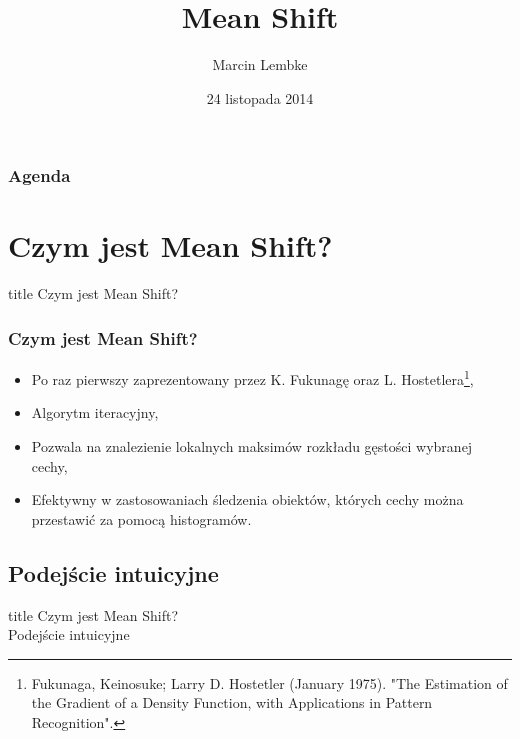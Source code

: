 \documentclass{beamer}
\title{Mean Shift}
\author{Marcin Lembke}
\date{24 listopada 2014}
\begin{document}
	\maketitle
	\begin{frame}
		\frametitle{Agenda}
		\tableofcontents
	\end{frame}
	
	\section{Czym jest Mean Shift?}
	\begin{frame}
		\begin{beamercolorbox}[colsep=-4bp,rounded=true,shadow=true,ht=0.5cm,dp=0.3cm,center]{title}
			  Czym jest Mean Shift?
		\end{beamercolorbox}
	\end{frame}
	
	\begin{frame}
		\frametitle{Czym jest Mean Shift?}
		\begin{itemize}
			\item Po raz pierwszy zaprezentowany przez K. Fukunagę oraz L. Hostetlera\footnote{Fukunaga, Keinosuke; Larry D. Hostetler (January 1975). "The Estimation of the Gradient of a Density Function, with Applications in Pattern Recognition".}, 
			\item Algorytm iteracyjny,
			\item Pozwala na znalezienie lokalnych maksimów rozkładu gęstości wybranej cechy,
			\item Efektywny w zastosowaniach śledzenia obiektów, których cechy można przestawić za pomocą histogramów.
		\end{itemize}
	\end{frame}
	
	\subsection{Podejście intuicyjne}
	\begin{frame}
		\begin{beamercolorbox}[colsep=-4bp,rounded=true,shadow=true,ht=1cm,dp=0.3cm,center]{title}
			  Czym jest Mean Shift?\\
			  Podejście intuicyjne
		\end{beamercolorbox}
	\end{frame}
	
\end{document}
